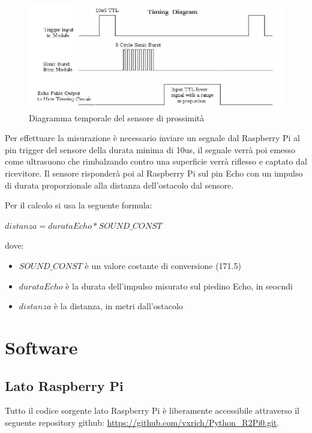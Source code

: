\documentclass[12pt]{article}
\newcommand{\raspi}{Raspberry Pi}
\begin{document}
\begin{figure}[h]
\includegraphics[width=\linewidth]{us_diagram}
\centering
\caption{Diagramma temporale del sensore di prossimità}
\label{fig:usdiagram}
\end{figure}

Per effettuare la misurazione è necessario inviare un segnale dal Raspberry Pi al pin trigger del sensore della durata minima di 10us, il segnale verrà poi emesso come ultrasuono che rimbalzando contro una superficie verrà riflesso e captato dal ricevitore. 
Il sensore risponderà poi al \raspi{} sul pin Echo con un impulso di durata proporzionale alla distanza dell'ostacolo dal sensore.

Per il calcolo si usa la seguente formula:\\
\begin{center}
$ distanza = durataEcho * SOUND\_CONST $
\end{center}
dove:
\begin{itemize}
\item $SOUND\_CONST$ è un valore costante di conversione (171.5)
\item $durataEcho$ è la durata dell'impulso misurato sul piedino Echo, in seocndi
\item $distanza$ è la distanza, in metri dall'ostacolo
\end{itemize}





\section{Software}

\subsection{Lato \raspi}

\begin{minipage}{\linewidth}
Tutto il codice sorgente lato \raspi{} è liberamente accessibile attraverso il seguente repository github:  \url{https://github.com/vxrich/Python_R2Pi0.git}.
\end{minipage}
\end{document}
